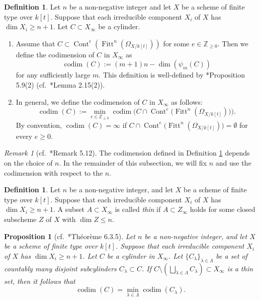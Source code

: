 \documentclass[a4paper,11pt]{amsart}
\newtheorem{prop}[thm]{Proposition}
\theoremstyle{definition}
\newtheorem{defi}[thm]{Definition}
\theoremstyle{remark}
\newtheorem{rmk}[thm]{Remark}
\begin{document}
\begin{defi}\label{defi:codim}
Let $n$ be a non-negative integer and 
let $X$ be a scheme of finite type over $k[t]$. 
Suppose that each irreducible component $X_i$ of $X$ has $\dim  X_i \ge n+1$. 
Let $C \subset X_{\infty}$ be a cylinder. 
\begin{enumerate}
\item 
Assume that $C \subset \operatorname{Cont}^e \left( \operatorname{Fitt}^n \left( \Omega _{X/k[t]} \right)\right)$ 
for some $e \in \mathbb{Z}_{\ge 0}$.
Then we define the codimension of $C$ in $X_\infty$ as
\[
\operatorname{codim}(C) := (m+1) n - \operatorname{dim}(\psi_m (C))
\]
for any sufficiently large $m$. This definition is well-defined by \cite{NS2}*{Proposition 5.9(2)} (cf.\ \cite{NS22}*{Lemma 2.15(2)}).

\item 
In general, we define the codimension of $C$ in $X_\infty$ as follows:
\[
\operatorname{codim}(C) := \min_{e \in \mathbb{Z}_{\ge 0}} {\operatorname{codim} \bigl(C \cap 
	\operatorname{Cont}^e \bigl( \operatorname{Fitt}^n \left( \Omega _{X/k[t]} \right) \bigr) \bigr)}. 
\]
By convention, $\operatorname{codim}(C) = \infty$ if 
$C \cap \operatorname{Cont}^e \bigl( \operatorname{Fitt}^n \left( \Omega _{X/k[t]} \right) \bigr) = \emptyset$
for every $e \ge 0$. 
\end{enumerate}
\end{defi}

\begin{rmk}[cf.\ \cite{NS2}*{Remark 5.12}]\label{rmk:codim}
The codimension defined in Definition \ref{defi:codim} depends on the choice of $n$. 
In the remainder of this subsection, we will fix $n$ and use the codimension with respect to the $n$.
\end{rmk}

\begin{defi}\label{defi:thin}
Let $n$ be a non-negative integer, and 
let $X$ be a scheme of finite type over $k[t]$. 
Suppose that each irreducible component $X_i$ of $X$ has $\dim X_i \ge n+1$. 
A subset $A \subset X_{\infty}$ is called \textit{thin} 
if $A \subset Z_{\infty}$ holds for some closed subscheme $Z$ of $X$ with $\dim Z \le n$. 
\end{defi}

\begin{prop}[{cf.\ \cite{Seb04}*{Th\'{e}or\`{e}me 6.3.5}}]\label{prop:negligible}
Let $n$ be a non-negative integer, and 
let $X$ be a scheme of finite type over $k[t]$. 
Suppose that each irreducible component $X_i$ of $X$ has $\dim X_i \ge n+1$. 
Let $C$ be a cylinder in $X_{\infty}$. 
Let $\{ C_{\lambda} \} _{\lambda \in \Lambda}$ be a set of countably many disjoint subcylinders $C_{\lambda} \subset C$. 
If $C \setminus (\bigsqcup _{\lambda \in \Lambda} C_{\lambda}) \subset X_{\infty}$ is a thin set, 
then it follows that 
\[
\operatorname{codim}(C) = \min _{\lambda \in \Lambda} \operatorname{codim}(C_{\lambda}). 
\]
\end{prop}
\end{document}
